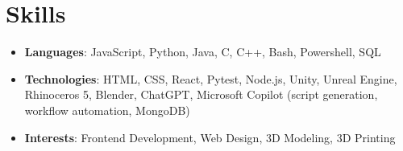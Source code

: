 \documentclass[letterpaper,11pt]{article}
\newcommand{\resumeSubHeadingListStart}{\begin{itemize}[leftmargin=*]}
\newcommand{\resumeSubHeadingListEnd}{\end{itemize}}
\begin{document}
%
\section{Skills}
    \resumeSubHeadingListStart
        \item{
            \textbf{Languages}{: JavaScript, Python, Java, C, C++, Bash, Powershell, SQL}
        }
        \item{
            \textbf{Technologies}{: HTML, CSS, React, Pytest, Node.js, Unity, Unreal Engine, Rhinoceros 5, Blender, ChatGPT, Microsoft Copilot (script generation, workflow automation, MongoDB)}
        }
        \item{
            \textbf{Interests}{: Frontend Development, Web Design, 3D Modeling, 3D Printing}
        }
    \resumeSubHeadingListEnd

\end{document}
